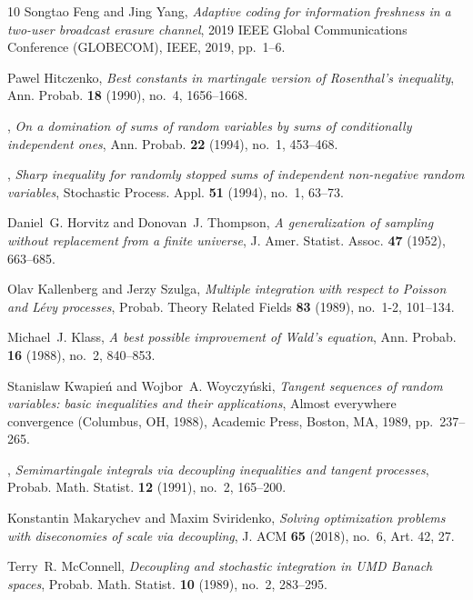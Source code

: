 \documentclass[ECP]{ejpecp} %
\begin{document}
\begin{thebibliography}{10}
Songtao Feng and Jing Yang, \emph{Adaptive coding for information freshness in a two-user broadcast erasure channel}, 2019 IEEE Global Communications Conference (GLOBECOM), IEEE, 2019, pp.~1--6.

Pawel Hitczenko, \emph{Best constants in martingale version of {R}osenthal's inequality}, Ann. Probab. \textbf{18} (1990), no.~4, 1656--1668. 

\bysame, \emph{On a domination of sums of random variables by sums of conditionally independent ones}, Ann. Probab. \textbf{22} (1994), no.~1, 453--468. 

\bysame, \emph{Sharp inequality for randomly stopped sums of independent non-negative random variables}, Stochastic Process. Appl. \textbf{51} (1994), no.~1, 63--73. 

Daniel~G. Horvitz and Donovan~J. Thompson, \emph{A generalization of sampling without replacement from a finite universe}, J. Amer. Statist. Assoc. \textbf{47} (1952), 663--685. 

Olav Kallenberg and Jerzy Szulga, \emph{Multiple integration with respect to {P}oisson and {L}\'evy processes}, Probab. Theory Related Fields \textbf{83} (1989), no.~1-2, 101--134. 

Michael~J. Klass, \emph{A best possible improvement of {W}ald's equation}, Ann. Probab. \textbf{16} (1988), no.~2, 840--853. 

Stanislaw Kwapie\'n and Wojbor~A. Woyczy\'nski, \emph{Tangent sequences of random variables: basic inequalities and their applications}, Almost everywhere convergence ({C}olumbus, {OH}, 1988), Academic Press, Boston, MA, 1989, pp.~237--265. 

\bysame, \emph{Semimartingale integrals via decoupling inequalities and tangent processes}, Probab. Math. Statist. \textbf{12} (1991), no.~2, 165--200. 

Konstantin Makarychev and Maxim Sviridenko, \emph{Solving optimization problems with diseconomies of scale via decoupling}, J. ACM \textbf{65} (2018), no.~6, Art. 42, 27. 

Terry~R. McConnell, \emph{Decoupling and stochastic integration in {UMD} {B}anach spaces}, Probab. Math. Statist. \textbf{10} (1989), no.~2, 283--295. 


\end{thebibliography}
\end{document}

